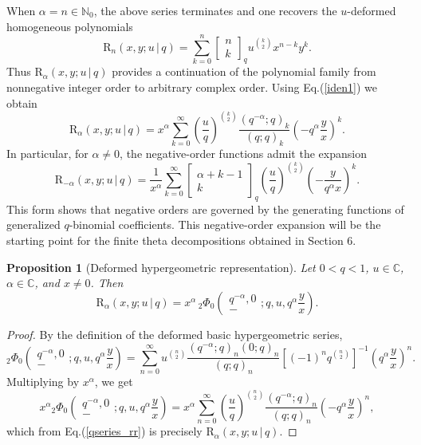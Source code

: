 \documentclass[12pt]{article}
\newcommand{\rr}{\mathrm{R}}
\newtheorem{proposition}{Proposition}
\begin{document}
When \(\alpha=n\in\mathbb{N}_0\), the above series terminates and one
recovers the \(u\)-deformed homogeneous polynomials
\[
\rr_n(x,y;u\,|\,q)
=
\sum_{k=0}^{n}
\begin{bmatrix}
n\\ k
\end{bmatrix}_{q}
u^{\binom{k}{2}}
x^{n-k}y^k.
\]
Thus \(\rr_{\alpha}(x,y;u\,|\,q)\) provides a continuation of the polynomial
family from nonnegative integer order to arbitrary complex order.
Using Eq.(\ref{iden1}) we obtain
\begin{equation}\label{qseries_rr}
\rr_{\alpha}(x,y;u\,|\,q)
=
x^\alpha
\sum_{k=0}^{\infty}\left(\frac{u}{q}\right)^{\binom{k}{2}}
\frac{(q^{-\alpha};q)_k}{(q;q)_k}
\left(-q^\alpha\frac{y}{x}\right)^k .
\end{equation}
In particular, for \(\alpha\neq 0\), the negative-order functions admit
the expansion
\begin{equation}\label{rr_GF_neg}
\rr_{-\alpha}(x,y;u\,|\,q)
=
\frac{1}{x^\alpha}
\sum_{k=0}^{\infty}
\begin{bmatrix}
\alpha+k-1\\ k
\end{bmatrix}_{q}
\left(\frac{u}{q}\right)^{\binom{k}{2}}
\left(-\frac{y}{q^\alpha x}\right)^k .
\end{equation}
This form shows that negative orders are governed by the generating
functions of generalized \(q\)-binomial coefficients. This negative-order expansion will be the starting point for the finite theta decompositions obtained in Section 6.

\begin{proposition}[Deformed hypergeometric representation]
Let \(0<q<1\), \(u\in\mathbb C\), \(\alpha\in\mathbb C\), and \(x\neq 0\).
Then
\[
\rr_{\alpha}(x,y;u\,|\,q)
=
x^\alpha\,
{}_2\Phi_0
\left(
\begin{matrix}
q^{-\alpha},0\\
-
\end{matrix}
;q,u,q^\alpha\frac{y}{x}
\right).
\]
\end{proposition}
\begin{proof}
By the definition of the deformed basic hypergeometric series,
\[
{}_2\Phi_0
\left(
\begin{matrix}
q^{-\alpha},0\\
-
\end{matrix}
;q,u,q^\alpha\frac{y}{x}
\right)
=
\sum_{n=0}^{\infty}
u^{\binom{n}{2}}
\frac{(q^{-\alpha};q)_n(0;q)_n}{(q;q)_n}
\left[(-1)^nq^{\binom{n}{2}}\right]^{-1}
\left(q^\alpha\frac{y}{x}\right)^n .
\]
Multiplying by \(x^\alpha\), we get
\[
x^\alpha
{}_2\Phi_0
\left(
\begin{matrix}
q^{-\alpha},0\\
-
\end{matrix}
;q,u,q^\alpha\frac{y}{x}
\right)
=
x^\alpha
\sum_{n=0}^{\infty}\left(\frac{u}{q}\right)^{\binom{n}{2}}
\frac{(q^{-\alpha};q)_n}{(q;q)_n}
\left(-q^\alpha\frac{y}{x}\right)^n,
\]
which from Eq.(\ref{qseries_rr}) is precisely \(\rr_{\alpha}(x,y;u\,|\,q)\).
\end{proof}
\end{document}
